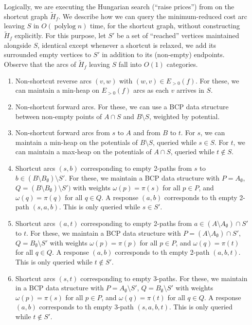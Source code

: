 \documentclass[11pt]{article}
\def\polylog{\mathop{\mathrm{polylog}}}
\theoremstyle{plain}
\numberwithin{figure}{section}
\begin{document}
Logically, we are executing the Hungarian search (``raise prices'') from
\cite[Section 3.2]{GHKT17} on the shortcut graph $\tilde{H}_f$.
We describe how we can query the minimum-reduced cost arc leaving $S$ in
$O(\polylog n)$ time, for the shortcut graph, without constructing
$\tilde{H}_f$ explicitly.
For this purpose, let $S'$ be a set of ``reached'' vertices maintained
alongside $S$, identical except whenever a shortcut is relaxed, we add its
surrounded empty vertices to $S'$ in addition to its (non-empty) endpoints.
Observe that the arcs of $\tilde{H}_f$ leaving $S$ fall into $O(1)$ categories.
\begin{enumerate}
\item Non-shortcut reverse arcs $(v, w)$ with $(w, v) \in E_{>0}(f)$.
	For these, we can maintain a min-heap on $E_{>0}(f)$ arcs as each $v$
	arrives in $S$.
\item Non-shortcut forward arcs.
	For these, we can use a BCP data structure between non-empty points of
	$A \cap S$ and $B \setminus S$, weighted by potential.
\item Non-shortcut forward arcs from $s$ to $A$ and from $B$ to $t$.
	For $s$, we can maintain a min-heap on the potentials of
	$B \setminus S$, queried while $s \in S$.
	For $t$, we can maintain a max-heap on the potentials of
	$A \cap S$, queried while $t \not\in S$.

\item Shortcut arcs $(s, b)$ corresponding to empty 2-paths from $s$ to
	$b \in (B \setminus B_\emptyset) \setminus S'$.
	For these, we maintain a BCP data structure with $P = A_\emptyset$,
	$Q = (B \setminus B_\emptyset) \setminus S')$ with weights
	$\omega(p) = \pi(s)$ for all $p \in P$, and $\omega(q) = \pi(q)$ for
	all $q \in Q$.
	A response $(a, b)$ corresponds to th empty 2-path $(s, a, b)$.
	This is only queried while $s \in S'$.
\item Shortcut arcs $(a, t)$ corresponding to empty 2-paths from
	$a \in (A \setminus A_\emptyset) \cap S'$ to $t$.
	For these, we maintain a BCP data structure with
	$P = (A \setminus A_\emptyset) \cap S'$,
	$Q = B_\emptyset \setminus S'$ with weights $\omega(p) = \pi(p)$ for
	all $p \in P$, and $\omega(q) = \pi(t)$ for all $q \in Q$.
	A response $(a, b)$ corresponds to th empty 2-path $(a, b, t)$.
	This is only queried while $t \not\in S'$.
\item Shortcut arcs $(s, t)$ corresponding to empty 3-paths.
	For these, we maintain in a BCP data structure with
	$P = A_\emptyset \setminus S'$, $Q = B_\emptyset \setminus S'$ with
	weights $\omega(p) = \pi(s)$ for all
	$p \in P$, and $\omega(q) = \pi(t)$ for all $q \in Q$.
	A response $(a, b)$ corresponds to th empty 3-path $(s, a, b, t)$.
	This is only queried while $t \not\in S'$.
\end{enumerate}
\end{document}
